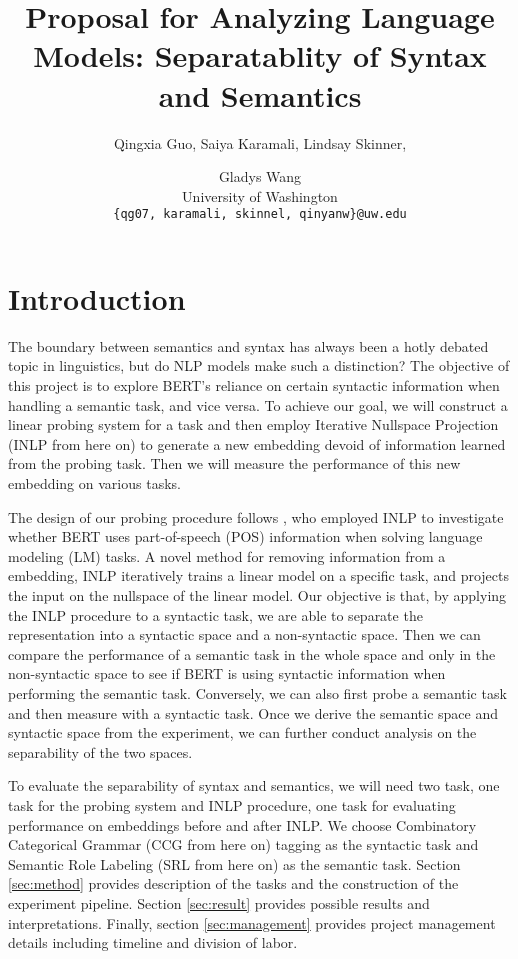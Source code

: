 \documentclass[11pt,a4paper]{article}
\title{Proposal for Analyzing Language Models: Separatablity of Syntax and Semantics}
\author{Qingxia Guo, Saiya Karamali, Lindsay Skinner, \and Gladys Wang
 \\ University of Washington \\ 
\texttt{\{qg07, karamali, skinnel, qinyanw\}@uw.edu}\\ 
}
\date{}
\begin{document}
\maketitle

\section{Introduction}

The boundary between semantics and syntax has always been a hotly debated topic in linguistics, but do NLP models make such a distinction? The objective of this project is to explore BERT\rq s \citep{bert} reliance on certain syntactic information when handling a semantic task, and vice versa. To achieve our goal, we will construct a linear probing system for a task and then employ Iterative Nullspace Projection (INLP from here on) \citep{inlp} to generate a new embedding devoid of information learned from the probing task. Then we will measure the performance of this new embedding on various tasks.

The design of our probing procedure follows \citealp{amnesia}, who employed INLP to investigate whether BERT uses part-of-speech (POS) information when solving language modeling (LM) tasks. A novel method for removing information from a embedding, INLP iteratively trains a linear model on a specific task, and projects the input on the nullspace of the linear model. Our objective is that, by applying the INLP procedure to a syntactic task, we are able to separate the representation into a syntactic space and a non-syntactic space. Then we can compare the performance of a semantic task in the whole space and only in the non-syntactic space to see if BERT is using syntactic information when performing the semantic task. Conversely, we can also first probe a semantic task and then measure with a syntactic task. Once we derive the semantic space and syntactic space from the experiment, we can further conduct analysis on the separability of the two spaces. 

To evaluate the separability of syntax and semantics, we will need two task, one task for the probing system and INLP procedure, one task for evaluating performance on embeddings before and after INLP. We choose Combinatory Categorical Grammar (CCG from here on) tagging \citep{ccg-bank} as the syntactic task and Semantic Role Labeling (SRL from here on) \citep{propbank} as the semantic task. Section \ref{sec:method} provides description of the tasks and the construction of the experiment pipeline. Section \ref{sec:result} provides possible results and interpretations. Finally, section \ref{sec:management} provides project management details including timeline and division of labor.
\end{document}
